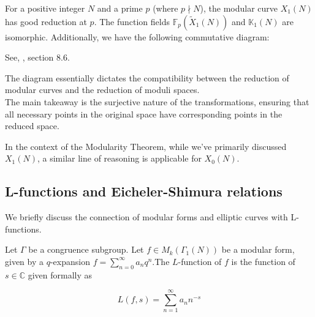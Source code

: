  \begin{theorem}
 For a positive integer \( N \) and a prime \( p \) (where \( p \nmid N \)), the modular curve \( X_{1}(N) \) has good reduction at \( p \). The function fields \( \mathbb{F}_{p}\left(\widetilde{X}_{1}(N)\right) \) and \( \mathbb{K}_{1}(N) \) are isomorphic. Additionally, we have the following commutative diagram:
\begin{center}
\end{center}

\begin{theorem}
    See, \cite{diamond2005first}, section 8.6.
\end{theorem}
    
 \end{theorem}
 
The diagram essentially dictates the compatibility between the reduction of modular curves and the reduction of moduli spaces. \\

The main takeaway is the surjective nature of the transformations, ensuring that all necessary points in the original space have corresponding points in the reduced space.

In the context of the Modularity Theorem, while we've primarily discussed \( X_{1}(N) \), a similar line of reasoning is applicable for \( X_{0}(N) \).
\subsection{L-functions and Eicheler-Shimura relations}

We briefly discuss the connection of modular forms and elliptic curves with L-functions. 

\begin{definition}
 Let $\Gamma$ be a congruence subgroup. Let $f \in M_{k}\left(\Gamma_{1}(N)\right)$ be a modular form, given by a $q$-expansion $f=\sum_{n=0}^{\infty} a_{n} q^{n}$.The $L$-function of $f$ is the function of $s \in \mathbb{C}$ given formally as

$$
L(f, s)=\sum_{n=1}^{\infty} a_{n} n^{-s}
$$

\end{definition}

